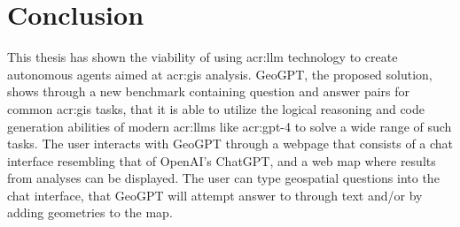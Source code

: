 \chapter{Conclusion}
\label{cha:conclusion}



\begin{comment}
What are the main contributions made to the field?
How significant are these contributions?
Also discuss the contributions in terms of the goals and research questions formulated in the Introduction.

The contributions section will normally contain everything that you address in the abstract, but in an extended form and quite possibly additional issues that cannot be included in the abstract.
An obvious difference is that when the reader has come this far in the text, she/he should be quite familiar with the work, but while reading the abstract they will have little to no knowledge of the work.

The section ``Contributions'' in Chapter~\ref{cha:introduction} differs from this one in that the former is just a list of the main bits, while this section should explain them in more detail.
However, basically the same items should appear in both sections.
\end{comment}

This thesis has shown the viability of using \gls{acr:llm} technology to create autonomous agents aimed at \acrshort{acr:gis} analysis. GeoGPT, the proposed solution, shows through a new benchmark containing question and answer pairs for common \acrshort{acr:gis} tasks, that it is able to utilize the logical reasoning and code generation abilities of modern \glspl{acr:llm} like \acrshort{acr:gpt}-4 to solve a wide range of such tasks. The user interacts with GeoGPT through a webpage that consists of a chat interface resembling that of OpenAI's ChatGPT, and a web map where results from analyses can be displayed. The user can type geospatial questions into the chat interface, that GeoGPT will attempt answer to through text and/or by adding geometries to the map.

